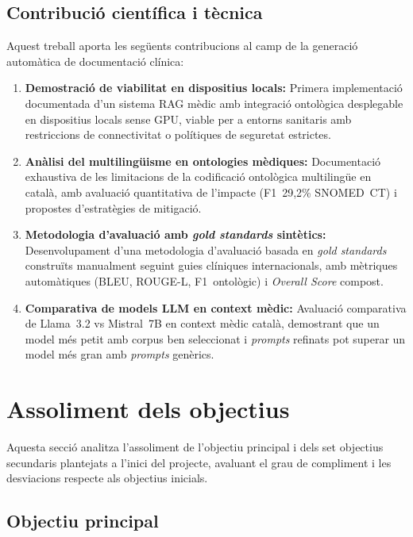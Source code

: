 \documentclass[CAT]{TFUOC}%
\begin{document}
\subsection{Contribució científica i tècnica}

Aquest treball aporta les següents contribucions al camp de la generació automàtica de documentació clínica:

\begin{enumerate}
    \item \textbf{Demostració de viabilitat en dispositius locals:} Primera implementació documentada d'un sistema RAG mèdic amb integració ontològica desplegable en dispositius locals sense GPU, viable per a entorns sanitaris amb restriccions de connectivitat o polítiques de seguretat estrictes.
    
    \item \textbf{Anàlisi del multilingüisme en ontologies mèdiques:} Documentació exhaustiva de les limitacions de la codificació ontològica multilingüe en català, amb avaluació quantitativa de l'impacte (F1~29,2\% SNOMED~CT) i propostes d'estratègies de mitigació.
    
    \item \textbf{Metodologia d'avaluació amb \textit{gold standards} sintètics:} Desenvolupament d'una metodologia d'avaluació basada en \textit{gold standards} construïts manualment seguint guies clíniques internacionals, amb mètriques automàtiques (BLEU, ROUGE-L, F1~ontològic) i \textit{Overall Score} compost.
    
    \item \textbf{Comparativa de models LLM en context mèdic:} Avaluació comparativa de Llama~3.2 vs Mistral~7B en context mèdic català, demostrant que un model més petit amb corpus ben seleccionat i \textit{prompts} refinats pot superar un model més gran amb \textit{prompts} genèrics.
\end{enumerate}

\section{Assoliment dels objectius}

Aquesta secció analitza l'assoliment de l'objectiu principal i dels set objectius secundaris plantejats a l'inici del projecte, avaluant el grau de compliment i les desviacions respecte als objectius inicials.

\subsection{Objectiu principal}
\end{document}
